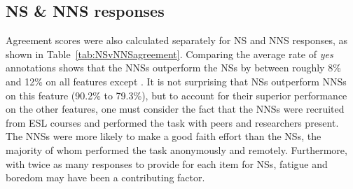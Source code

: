 \subsection{NS \& NNS responses}
\label{NSandNNSagreement}
Agreement scores were also calculated separately for NS and NNS responses, as shown in Table~\ref{tab:NSvNNSagreement}. Comparing the average rate of \textit{yes} annotations shows that the NNSs outperform the NSs by between roughly 8\% and 12\% on all features except . It is not surprising that NSs outperform NNSs on this feature (90.2\% to 79.3\%), but to account for their superior performance on the other features, one must consider the fact that the NNSs were recruited from ESL courses and performed the task with peers and researchers present. The NNSs were more likely to make a good faith effort than the NSs, the majority of whom performed the task anonymously and remotely. Furthermore, 
with twice as many responses to provide for each item for NSs, fatigue and boredom may have been a contributing factor.

